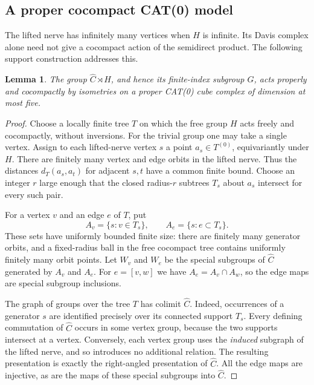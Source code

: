 \documentclass[11pt]{article}
\newtheorem{lemma}[theorem]{Lemma}
\theoremstyle{definition}
\theoremstyle{remark}
\begin{document}
\subsection{A proper cocompact CAT(0) model}
\label{rf:assembly}

The lifted nerve has infinitely many vertices when $H$ is infinite.
Its Davis complex alone need not give a cocompact action of the
semidirect product.  The following support construction addresses this.

\begin{lemma}
\label{rf:cat0}
The group $\widehat C\rtimes H$, and hence its finite-index subgroup
$G$, acts properly and cocompactly by isometries on a proper CAT(0)
cube complex of dimension at most five.
\end{lemma}

\begin{proof}
Choose a locally finite tree $T$ on which the free group $H$ acts
freely and cocompactly, without inversions.  For the trivial group
one may take a single vertex.  Assign to each lifted-nerve vertex
$s$ a point $a_s\in T^{(0)}$, equivariantly under $H$.  There are
finitely many vertex and edge orbits in the lifted nerve.  Thus the
distances $d_T(a_s,a_t)$ for adjacent $s,t$ have a common finite bound.
Choose an integer $r$ large enough that the closed radius-$r$ subtrees
$T_s$ about $a_s$ intersect for every such pair.

For a vertex $v$ and an edge $e$ of $T$, put
\[
 A_v=\{s:v\in T_s\},\qquad
 A_e=\{s:e\subset T_s\}.
\]
These sets have uniformly bounded finite size: there are finitely many
generator orbits, and a fixed-radius ball in the free cocompact tree
contains uniformly finitely many orbit points.  Let $W_v$ and $W_e$
be the special subgroups of $\widehat C$ generated by $A_v$ and $A_e$.
For $e=[v,w]$ we have $A_e=A_v\cap A_w$, so the edge maps are special
subgroup inclusions.

The graph of groups over the tree $T$ has colimit $\widehat C$.
Indeed, occurrences of a generator $s$ are identified precisely over
its connected support $T_s$.  Every defining commutation of
$\widehat C$ occurs in some vertex group, because the two supports
intersect at a vertex.  Conversely, each vertex group uses the
\emph{induced} subgraph of the lifted nerve, and so introduces no
additional relation.  The resulting presentation is exactly the
right-angled presentation of $\widehat C$.  All the edge maps are
injective, as are the maps of these special subgroups into
$\widehat C$.


\end{proof}
\end{document}
